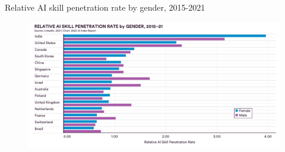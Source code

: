 {

\begin{frame}{
Relative AI skill penetration rate by gender, 2015-2021
}

\begin{figure}
 \centering
 \includegraphics[width=1.0\textwidth]{./figures/progress-of-air-f/outputs/drawing-v00.png}
\end{figure}

\end{frame}
}






